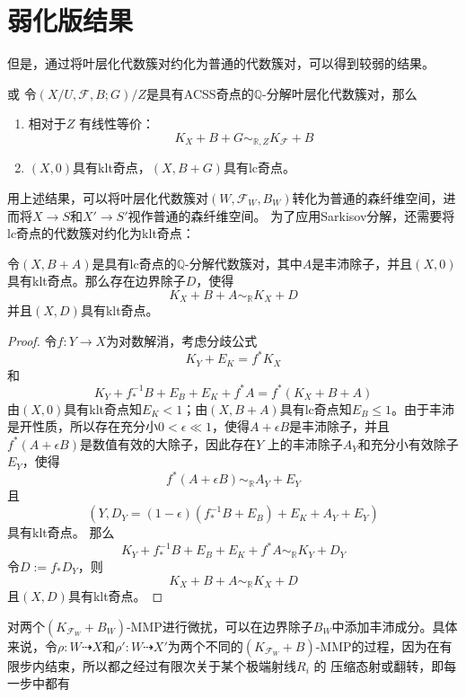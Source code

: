\section{弱化版结果}
但是，通过将叶层化代数簇对约化为普通的代数簇对，可以得到较弱的结果。
\begin{theorem}\cite[Proposition 3.6]{acss}或\cite[Proposition 7.3.6]{chlx}  
  令$(X/U,\mathcal{F},B;G)/Z$是具有ACSS奇点的$\mathbb{Q}$-分解叶层化代数簇对，那么
  \begin{enumerate}
    \item 相对于$Z$ 有线性等价：
      \[ K_{X}+B+G\sim_{\mathbb{R},Z}K_{\mathcal{F}}+B \]
    \item $(X,0)$具有klt奇点，$(X,B+G)$具有lc奇点。
  \end{enumerate}
\end{theorem}
用上述结果，可以将叶层化代数簇对$(W,\mathcal{F}_{W},B_{W})$转化为普通的森纤维空间，进而将$X\to S$和$X' \to S'$视作普通的森纤维空间。
为了应用Sarkisov分解，还需要将lc奇点的代数簇对约化为klt奇点：
\begin{lemma}\label{lctoklt}
 令$(X,B+A)$是具有lc奇点的$\mathbb{Q}$-分解代数簇对，其中$A$是丰沛除子，并且$(X,0)$具有klt奇点。那么存在边界除子$D$，使得
 \[ K_{X}+B+A\sim_{\mathbb{R}}K_{X}+D \]
 并且$(X,D)$具有klt奇点。
\end{lemma}
\begin{proof}
  令$f:Y\to X$为对数解消，考虑分歧公式
  \[ K_{Y}+E_{K}=f^{*}K_{X} \]
  和
  \[ K_{Y}+f^{-1}_{*}B+E_{B}+E_{K}+f^{*}A=f^{*}(K_{X}+B+A) \]
  由$(X,0)$具有klt奇点知$E_{K}< 1 $；由$(X,B+A)$具有lc奇点知$E_{B}\leqslant 1$。由于丰沛是开性质，所以存在充分小$0< \epsilon \ll 1$，使得$A+\epsilon B$是丰沛除子，并且$f^{*}(A+\epsilon B)$是数值有效的大除子，因此存在$Y$ 上的丰沛除子$A_{Y}$和充分小有效除子$E_{Y}$，使得
  \[ f^{*}(A+\epsilon B)\sim_{\mathbb{R}} A_{Y}+E_{Y} \]
  且
  \[ \left(Y,D_{Y}=(1-\epsilon)(f^{-1}_{*}B+E_{B})+E_{K}+A_{Y}+E_{Y}\right) \]
  具有klt奇点。 那么
  \[ K_{Y}+f^{-1}_{*}B+E_{B}+E_{K}+f^{*}A\sim_{\mathbb{R}} K_{Y}+D_{Y} \]
  令$D:=f_{*}D_{Y}$，则
  \[ K_{X}+B+A\sim_{\mathbb{R}} K_{X}+D \]
  且$(X,D)$具有klt奇点。 \end{proof}
对两个$(K_{\mathcal{F}_{W}}+B_{W})$-MMP进行微扰，可以在边界除子$B_{W}$中添加丰沛成分。具体来说，令$\rho:W \dashrightarrow X$和$\rho': W \dashrightarrow X'$为两个不同的$(K_{\mathcal{F}_{W}}+B)$-MMP的过程，因为在有限步内结束，所以都之经过有限次关于某个极端射线$R_{i}$ 的 压缩态射或翻转，即每一步中都有
